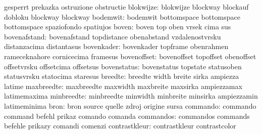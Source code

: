                            gesperrt                  prekazka
                           ostruzione                obstructie
                blokwijze: blokwijze                 blockway
                           blockauf                  dobloku
                           blockway                  blockway %
                 bodemwit: bodemwit                  bottomspace
                           bottomspace               bottomspace
                           spaziofondo               spatiujos
                    boven: boven                     top
                           oben                      vrsek
                           cima                      sus
             bovenafstand: bovenafstand              topdistance
                           obenabstand               vzdalenostvrsku
                           distanzacima              distantasus
               bovenkader: bovenkader                topframe
                           obenrahmen                rameceknahore
                           cornicecima               framesus
              bovenoffset: bovenoffset               topoffset
                           obenoffset                offsetvrsku
                           offsetcima                offsetsus
              bovenstatus: bovenstatus               topstate
                           statusoben                statusvrsku
                           statocima                 staresus
                  breedte: breedte                   width
                           breite                    sirka
                           ampiezza                  latime
               maxbreedte: maxbreedte                maxwidth
                           maxbreite                 maxsirka
                           ampiezzamax               latimemaxima
               minbreedte: minbreedte                minwidth
                           minbreite                 minsirka
                           ampiezzamin               latimeminima %
                     bron: bron                      source
                           quelle                    zdroj
                           origine                   sursa
                 commando: commando                  command
                           befehl                    prikaz
                           comando                   comanda
                commandos: commandos                 commands
                           befehle                   prikazy
                           comandi                   comenzi
            contrastkleur: contrastkleur             contrastcolor

